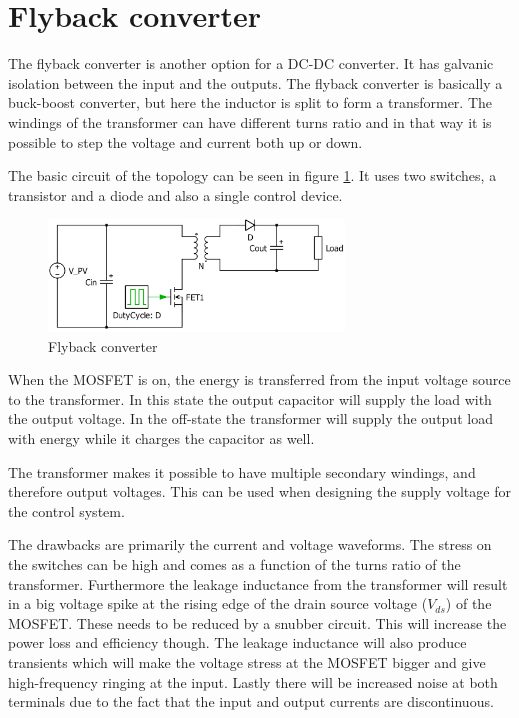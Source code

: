 \section{Flyback converter}

The flyback converter is another option for a DC-DC converter. It has galvanic isolation between the input and the outputs. The flyback converter is basically a buck-boost converter, but here the inductor is split to form a transformer. The windings of the transformer can have different turns ratio and in that way it is possible to step the voltage and current both up or down. 

The basic circuit of the topology can be seen in figure \ref{Flyback_SCHEMATIC}. It uses two switches, a transistor and a diode and also a single control device.    

\begin{figure}[H]
	\begin{center}
	\includegraphics[width=0.7\textwidth]{../Pictures/flyback_schem.png}
	\caption{Flyback converter}
	\label{Flyback_SCHEMATIC}
	\end{center}
\end{figure}

When the MOSFET is on, the energy is transferred from the input voltage source to the transformer. In this state the output capacitor will supply the load with the output voltage. In the off-state the transformer will supply the output load with energy while it charges the capacitor as well\cite{flyback}. 


The transformer makes it possible to have multiple secondary windings, and therefore output voltages. This can be used when designing the supply voltage for the control system.  

The drawbacks are primarily the current and voltage waveforms. The stress on the switches can be high and comes as a function of the turns ratio of the transformer. Furthermore the leakage inductance from the transformer will result in a big voltage spike at the rising edge of the drain source voltage ($V_{ds}$) of the MOSFET. These needs to be reduced by a snubber circuit. This will increase the power loss and efficiency though. The leakage inductance will also produce transients which will make the voltage stress at the MOSFET bigger and give high-frequency ringing at the input. Lastly there will be increased noise at both terminals due to the fact that the input and output currents are discontinuous\cite{underthehood}.
